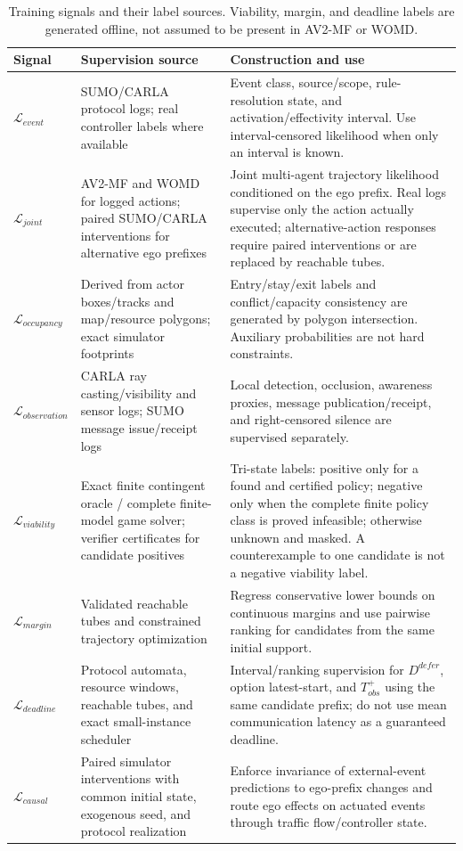\documentclass[letterpaper]{article} %
\begin{document}
\begin{table}[t]
\centering\small
\begin{tabular}{@{}p{}p{}p{}@{}}
\toprule
Signal & Supervision source & Construction and use\\
\midrule
$\mathcal L_{event}$ & SUMO/CARLA protocol logs; real controller labels where available & Event class, source/scope, rule-resolution state, and activation/effectivity interval. Use interval-censored likelihood when only an interval is known.\\
$\mathcal L_{joint}$ & AV2-MF and WOMD for logged actions; paired SUMO/CARLA interventions for alternative ego prefixes & Joint multi-agent trajectory likelihood conditioned on the ego prefix. Real logs supervise only the action actually executed; alternative-action responses require paired interventions or are replaced by reachable tubes.\\
$\mathcal L_{occupancy}$ & Derived from actor boxes/tracks and map/resource polygons; exact simulator footprints & Entry/stay/exit labels and conflict/capacity consistency are generated by polygon intersection. Auxiliary probabilities are not hard constraints.\\
$\mathcal L_{observation}$ & CARLA ray casting/visibility and sensor logs; SUMO message issue/receipt logs & Local detection, occlusion, awareness proxies, message publication/receipt, and right-censored silence are supervised separately.\\
$\mathcal L_{viability}$ & Exact finite contingent oracle / complete finite-model game solver; verifier certificates for candidate positives & Tri-state labels: positive only for a found and certified policy; negative only when the complete finite policy class is proved infeasible; otherwise unknown and masked. A counterexample to one candidate is not a negative viability label.\\
$\mathcal L_{margin}$ & Validated reachable tubes and constrained trajectory optimization & Regress conservative lower bounds on continuous margins and use pairwise ranking for candidates from the same initial support.\\
$\mathcal L_{deadline}$ & Protocol automata, resource windows, reachable tubes, and exact small-instance scheduler & Interval/ranking supervision for $D^{defer}$, option latest-start, and $T_{obs}^{+}$ using the same candidate prefix; do not use mean communication latency as a guaranteed deadline.\\
$\mathcal L_{causal}$ & Paired simulator interventions with common initial state, exogenous seed, and protocol realization & Enforce invariance of external-event predictions to ego-prefix changes and route ego effects on actuated events through traffic flow/controller state.\\
\bottomrule
\end{tabular}
\caption{Training signals and their label sources. Viability, margin, and deadline labels are generated offline, not assumed to be present in AV2-MF or WOMD.}
\label{tab:supervision}
\end{table}
\end{document}
